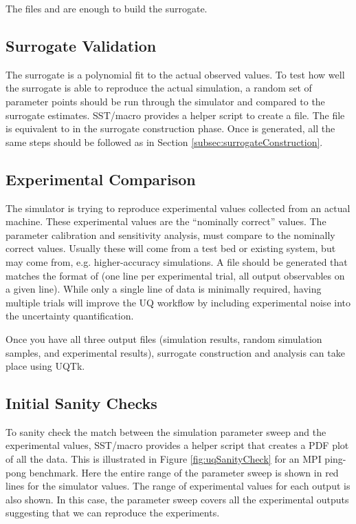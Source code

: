 The files  and  are enough to build the surrogate.

\subsection{Surrogate Validation}
The surrogate is a polynomial fit to the actual observed values.
To test how well the surrogate is able to reproduce the actual simulation, a random set of parameter points should be run through the simulator and compared to the surrogate estimates.
SST/macro provides a helper script  to create a  file.
The  file is equivalent to  in the surrogate construction phase.
Once  is generated, all the same steps should be followed as in Section \ref{subsec:surrogateConstruction}.

\subsection{Experimental Comparison}
The simulator is trying to reproduce experimental values collected from an actual machine.
These experimental values are the ``nominally correct'' values.
The parameter calibration and sensitivity analysis, 
must compare to the nominally correct values.
Usually these will come from a test bed or existing system, 
but may come from, e.g. higher-accuracy simulations.
A file  should be generated that matches the format of  (one line per experimental trial, all output observables on a given line).
While only a single line of data is minimally required,
having multiple trials will improve the UQ workflow by including experimental noise into the uncertainty quantification.

Once you have all three output files (simulation results, random simulation samples, and experimental results),
surrogate construction and analysis can take place using UQTk.

\subsection{Initial Sanity Checks}
To sanity check the match between the simulation parameter sweep and the experimental values, 
SST/macro provides a helper script  that creates a PDF plot of all the data.
This is illustrated in Figure \ref{fig:uqSanityCheck} for an MPI ping-pong benchmark.
Here the entire range of the parameter sweep is shown in red lines for the simulator values.
The range of experimental values for each output is also shown.
In this case, the parameter sweep covers all the experimental outputs suggesting that we can reproduce the experiments.

